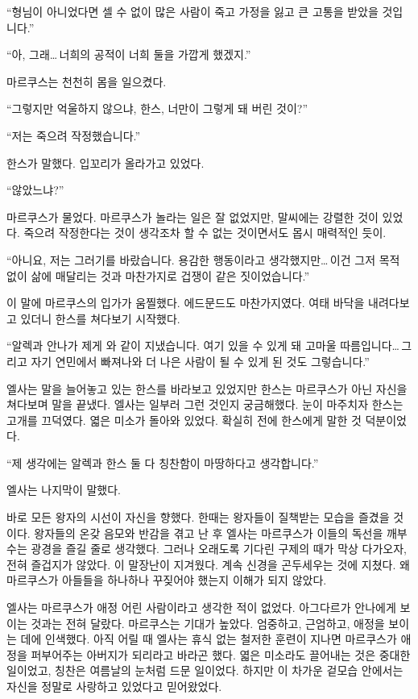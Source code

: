 ``형님이 아니었다면 셀 수 없이 많은 사람이 죽고 가정을 잃고 큰 고통을 받았을 것입니다.''

``아, 그래\ldots\,너희의 공적이 너희 둘을 가깝게 했겠지.''

마르쿠스는 천천히 몸을 일으켰다.

``그렇지만 억울하지 않으냐, 한스, 너만이 그렇게 돼 버린 것이?''

``저는 죽으려 작정했습니다.''

한스가 말했다. 입꼬리가 올라가고 있었다.

`` 않았느냐?''

마르쿠스가 물었다. 마르쿠스가 놀라는 일은 잘 없었지만, 말씨에는 강렬한 것이 있었다. 죽으려 작정한다는 것이 생각조차 할 수 없는 것이면서도 몹시 매력적인 듯이.

``아니요, 저는 그러기를 바랐습니다. 용감한 행동이라고 생각했지만\ldots\,이건 그저 목적 없이 삶에 매달리는 것과 마찬가지로 겁쟁이 같은 짓이었습니다.''

이 말에 마르쿠스의 입가가 움찔했다. 에드문드도 마찬가지였다. 여태 바닥을 내려다보고 있더니 한스를 쳐다보기 시작했다.

``알렉과 안나가 제게 와 같이 지냈습니다. 여기 있을 수 있게 돼 고마울 따름입니다\ldots\,그리고 자기 연민에서 빠져나와 더 나은 사람이 될 수 있게 된 것도 그렇습니다.''

엘사는 말을 늘어놓고 있는 한스를 바라보고 있었지만 한스는 마르쿠스가 아닌 자신을 쳐다보며 말을 끝냈다. 엘사는 일부러 그런 것인지 궁금해했다. 눈이 마주치자 한스는 고개를 끄덕였다. 엷은 미소가 돌아와 있었다. 확실히 전에 한스에게 말한 것 덕분이었다.

``제 생각에는 알렉과 한스 둘 다 칭찬함이 마땅하다고 생각합니다.''

엘사는 나지막이 말했다.

바로 모든 왕자의 시선이 자신을 향했다. 한때는 왕자들이 질책받는 모습을 즐겼을 것이다. 왕자들의 온갖 음모와 반감을 겪고 난 후 엘사는 마르쿠스가 이들의 독선을 깨부수는 광경을 즐길 줄로 생각했다. 그러나 오래도록 기다린 구제의 때가 막상 다가오자, 전혀 즐겁지가 않았다. 이 말장난이 지겨웠다. 계속 신경을 곤두세우는 것에 지쳤다. 왜 마르쿠스가 아들들을 하나하나 꾸짖어야 했는지 이해가 되지 않았다.

엘사는 마르쿠스가 애정 어린 사람이라고 생각한 적이 없었다. 아그다르가 안나에게 보이는 것과는 전혀 달랐다. 마르쿠스는 기대가 높았다. 엄중하고, 근엄하고, 애정을 보이는 데에 인색했다. 아직 어릴 때 엘사는 휴식 없는 철저한 훈련이 지나면 마르쿠스가 애정을 퍼부어주는 아버지가 되리라고 바라곤 했다. 엷은 미소라도 끌어내는 것은 중대한 일이었고, 칭찬은 여름날의 눈처럼 드문 일이었다. 하지만 이 차가운 겉모습 안에서는 자신을 정말로 사랑하고 있었다고 믿어왔었다.

